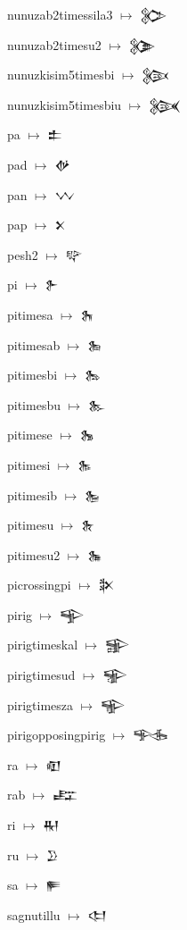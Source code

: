 {\noindent nunuzab2timessila3 $\mapsto$ {\cufont 𒉶}\par
\noindent nunuzab2timesu2 $\mapsto$ {\cufont 𒉷}\par
\noindent nunuzkisim5timesbi $\mapsto$ {\cufont 𒉸}\par
\noindent nunuzkisim5timesbiu $\mapsto$ {\cufont 𒉹}\par
\noindent pa $\mapsto$ {\cufont 𒉺}\par
\noindent pad $\mapsto$ {\cufont 𒉻}\par
\noindent pan $\mapsto$ {\cufont 𒉼}\par
\noindent pap $\mapsto$ {\cufont 𒉽}\par
\noindent pesh2 $\mapsto$ {\cufont 𒉾}\par
\noindent pi $\mapsto$ {\cufont 𒉿}\par
\noindent pitimesa $\mapsto$ {\cufont 𒊀}\par
\noindent pitimesab $\mapsto$ {\cufont 𒊁}\par
\noindent pitimesbi $\mapsto$ {\cufont 𒊂}\par
\noindent pitimesbu $\mapsto$ {\cufont 𒊃}\par
\noindent pitimese $\mapsto$ {\cufont 𒊄}\par
\noindent pitimesi $\mapsto$ {\cufont 𒊅}\par
\noindent pitimesib $\mapsto$ {\cufont 𒊆}\par
\noindent pitimesu $\mapsto$ {\cufont 𒊇}\par
\noindent pitimesu2 $\mapsto$ {\cufont 𒊈}\par
\noindent picrossingpi $\mapsto$ {\cufont 𒊉}\par
\noindent pirig $\mapsto$ {\cufont 𒊊}\par
\noindent pirigtimeskal $\mapsto$ {\cufont 𒊋}\par
\noindent pirigtimesud $\mapsto$ {\cufont 𒊌}\par
\noindent pirigtimesza $\mapsto$ {\cufont 𒊍}\par
\noindent pirigopposingpirig $\mapsto$ {\cufont 𒊎}\par
\noindent ra $\mapsto$ {\cufont 𒊏}\par
\noindent rab $\mapsto$ {\cufont 𒊐}\par
\noindent ri $\mapsto$ {\cufont 𒊑}\par
\noindent ru $\mapsto$ {\cufont 𒊒}\par
\noindent sa $\mapsto$ {\cufont 𒊓}\par
\noindent sagnutillu $\mapsto$ {\cufont 𒊔}\par
}
